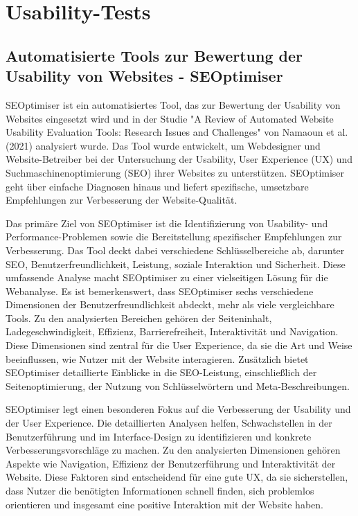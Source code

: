 \section{Usability-Tests}
\label{sec:usabilitytests}


\subsection{Automatisierte Tools zur Bewertung der Usability von Websites - SEOptimiser}
\label{sec:automatisierte_tools_zur_bewertung_der_usability_von_websites_seooptimiser}

SEOptimiser ist ein automatisiertes Tool, das zur Bewertung der Usability von Websites eingesetzt wird und in der Studie "A Review of Automated Website Usability Evaluation Tools: Research Issues and Challenges" von Namaoun et al. (2021) analysiert wurde. Das Tool wurde entwickelt, um Webdesigner und Website-Betreiber bei der Untersuchung der Usability, User Experience (UX) und Suchmaschinenoptimierung (SEO) ihrer Websites zu unterstützen. SEOptimiser geht über einfache Diagnosen hinaus und liefert spezifische, umsetzbare Empfehlungen zur Verbesserung der Website-Qualität.

Das primäre Ziel von SEOptimiser ist die Identifizierung von Usability- und Performance-Problemen sowie die Bereitstellung spezifischer Empfehlungen zur Verbesserung. Das Tool deckt dabei verschiedene Schlüsselbereiche ab, darunter SEO, Benutzerfreundlichkeit, Leistung, soziale Interaktion und Sicherheit. Diese umfassende Analyse macht SEOptimiser zu einer vielseitigen Lösung für die Webanalyse. Es ist bemerkenswert, dass SEOptimiser sechs verschiedene Dimensionen der Benutzerfreundlichkeit abdeckt, mehr als viele vergleichbare Tools. Zu den analysierten Bereichen gehören der Seiteninhalt, Ladegeschwindigkeit, Effizienz, Barrierefreiheit, Interaktivität und Navigation. Diese Dimensionen sind zentral für die User Experience, da sie die Art und Weise beeinflussen, wie Nutzer mit der Website interagieren. Zusätzlich bietet SEOptimiser detaillierte Einblicke in die SEO-Leistung, einschließlich der Seitenoptimierung, der Nutzung von Schlüsselwörtern und Meta-Beschreibungen.

SEOptimiser legt einen besonderen Fokus auf die Verbesserung der Usability und der User Experience. Die detaillierten Analysen helfen, Schwachstellen in der Benutzerführung und im Interface-Design zu identifizieren und konkrete Verbesserungsvorschläge zu machen. Zu den analysierten Dimensionen gehören Aspekte wie Navigation, Effizienz der Benutzerführung und Interaktivität der Website. Diese Faktoren sind entscheidend für eine gute UX, da sie sicherstellen, dass Nutzer die benötigten Informationen schnell finden, sich problemlos orientieren und insgesamt eine positive Interaktion mit der Website haben.

